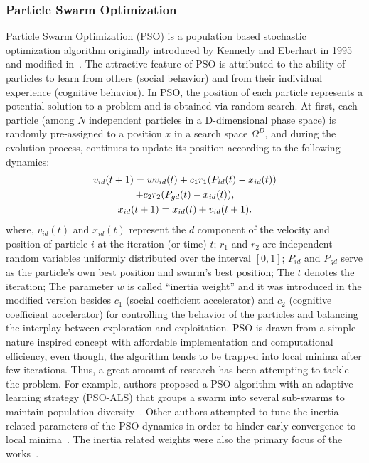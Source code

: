 \documentclass{ieeeaccess}
\begin{document}
\subsubsection{Particle Swarm Optimization}
Particle Swarm Optimization (PSO) is a population based stochastic optimization algorithm originally introduced by Kennedy and Eberhart in 1995~\cite{kennedy1995particle} and modified in~\cite{shi1998modified}. The attractive feature of PSO is attributed to the ability of particles to learn from others (social behavior) and from their individual experience (cognitive behavior). In PSO, the position of each particle represents a potential solution to a problem and is obtained via random search. At first, each particle (among $N$ independent particles in a D-dimensional phase space) is randomly pre-assigned to a position $x$ in a search space $\Omega^D$, and during the evolution process, continues to update its position according to the following dynamics:
\begin{gather}
\label{eq:PSO_original}
v_{id}(t+1)=wv_{id}(t)+c_1r_1(P_{id}(t)-x_{id}(t))
\notag\\+c_2r_2(P_{gd}(t)-x_{id}(t)),\label{eq:sub1_PSO_original}\nonumber
\\
x_{id}(t+1)=x_{id}(t)+v_{id}(t+1).\label{eq:sub2_PSO_original}
\end{gather}
where, $v_{id}(t)$ and $x_{id}(t)$ represent the $d$ component of the velocity and position of particle $i$ at the iteration (or time) $t$; $r_1$ and $r_2$ are independent random variables uniformly distributed over the interval $\left[0,1\right]$; $P_{id}$ and $P_{gd}$ serve as the particle's own best position and swarm's best position; The $t$ denotes the iteration; The parameter $w$ is called ``inertia weight'' and it was introduced in the modified version besides $c_1$ (social coefficient accelerator) and $c_2$ (cognitive coefficient accelerator) for controlling the behavior of the particles and balancing the interplay between exploration and exploitation. 
PSO is drawn from a simple nature inspired concept with affordable implementation and computational efficiency, even though, the algorithm tends to be trapped into local minima after few iterations. Thus, a great amount of research has been attempting to tackle the problem. For example, authors proposed a PSO algorithm with an adaptive learning strategy (PSO-ALS) that groups a swarm into several sub-swarms to maintain population diversity~\cite{zhang2020particle}. Other authors attempted to tune the inertia-related parameters of the PSO dynamics in order to hinder early convergence to local minima~\cite{han2018APSO}. The inertia related weights were also the primary focus of the works~\cite{LI2019a,bansal2011inertia,NICKABADI2011a,liu2016an}.
\end{document}
